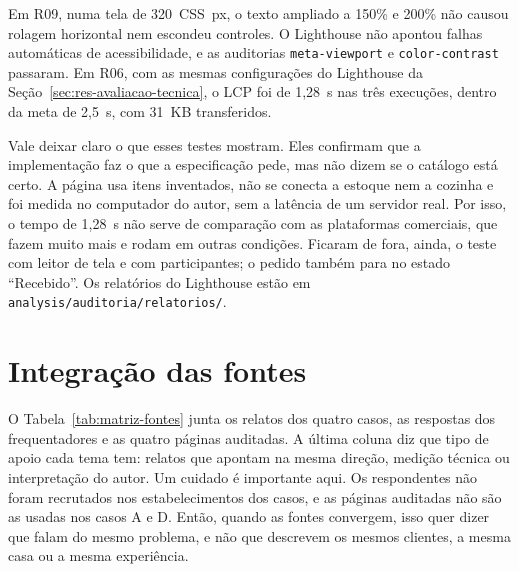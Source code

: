 Em R09, numa tela de 320~CSS~px, o texto ampliado a 150\% e 200\% não causou rolagem horizontal nem escondeu controles. O Lighthouse não apontou falhas automáticas de acessibilidade, e as auditorias \texttt{meta-viewport} e \texttt{color-contrast} passaram. Em R06, com as mesmas configurações do Lighthouse da Seção~\ref{sec:res-avaliacao-tecnica}, o LCP foi de 1,28~s nas três execuções, dentro da meta de 2,5~s, com 31~KB transferidos.

Vale deixar claro o que esses testes mostram. Eles confirmam que a implementação faz o que a especificação pede, mas não dizem se o catálogo está certo. A página usa itens inventados, não se conecta a estoque nem a cozinha e foi medida no computador do autor, sem a latência de um servidor real. Por isso, o tempo de 1,28~s não serve de comparação com as plataformas comerciais, que fazem muito mais e rodam em outras condições. Ficaram de fora, ainda, o teste com leitor de tela e com participantes; o pedido também para no estado ``Recebido''. Os relatórios do Lighthouse estão em \texttt{analysis/\allowbreak auditoria/\allowbreak relatorios/}.

\section{Integração das fontes}
\label{sec:res-integracao}

O Tabela~\ref{tab:matriz-fontes} junta os relatos dos quatro casos, as respostas dos frequentadores e as quatro páginas auditadas. A última coluna diz que tipo de apoio cada tema tem: relatos que apontam na mesma direção, medição técnica ou interpretação do autor. Um cuidado é importante aqui. Os respondentes não foram recrutados nos estabelecimentos dos casos, e as páginas auditadas não são as usadas nos casos A e D. Então, quando as fontes convergem, isso quer dizer que falam do mesmo problema, e não que descrevem os mesmos clientes, a mesma casa ou a mesma experiência.


